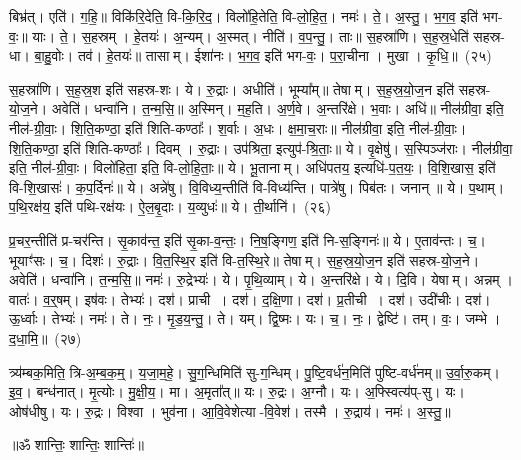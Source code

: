 बिभ्र॑त्। एति॑। ग॒हि॒॥ 
विकि॑रि॒देति॒ वि-कि॒रि॒द॒। विलो॑हि॒तेति॒ वि-लो॒हि॒त॒। नमः॑। ते॒। अ॒स्तु॒। भ॒ग॒व॒ इति॑ भग-वः॒॥ 
याः। ते॒। स॒हस्रम्। हे॒तयः॑। अ॒न्यम्। अ॒स्मत्। नीति॑। व॒प॒न्तु॒। ताः॥ 
स॒हस्रा॑णि। स॒ह॒स्र॒धेति॑ सहस्र-धा। बा॒हु॒वोः। तव॑। हे॒तयः॑॥ 
तासाम्। ईशा॑नः। भ॒ग॒व॒ इति॑ भग-वः॒। प॒रा॒चीना। मुखा। कृ॒धि॒॥~(२५)


स॒हस्रा॑णि। स॒ह॒स्र॒श इति॑ सहस्र-शः। ये। रु॒द्राः। अधीति॑। भूम्या᳚म्॥ 
तेषाम्। स॒ह॒स्र॒यो॒ज॒न इति॑ सहस्र-यो॒ज॒ने। अवेति॑। धन्वा॑नि। त॒न्म॒सि॒॥ 
अ॒स्मिन्। म॒ह॒ति। अ॒र्ण॒वे। अ॒न्तरि॑क्षे। भ॒वाः। अधि॑॥ 
नील॑ग्रीवा॒ इति॒ नील॑-ग्री॒वाः॒। शि॒ति॒कण्ठा॒ इति॑ शिति-कण्ठाः᳚। श॒र्वाः। अ॒धः। क्ष॒मा॒च॒राः॥ 
नील॑ग्रीवा॒ इति॒ नील॑-ग्री॒वाः॒। शि॒ति॒कण्ठा॒ इति॑ शिति-कण्ठाः᳚। दिवम्। रु॒द्राः। उप॑श्रिता॒ इत्युप॑-श्रि॒ताः॒॥ 
ये। वृ॒क्षेषु॑। स॒स्पिञ्ज॑राः। नील॑ग्रीवा॒ इति॒ नील॑-ग्री॒वाः॒। विलो॑हिता॒ इति॒ वि-लो॒हि॒ताः॒॥ 
ये। भू॒तानाम्। अधि॑पतय॒ इत्यधि॑-प॒त॒यः॒। वि॒शि॒खास॒ इति॑ वि-शि॒खासः॑। क॒प॒र्दिनः॑॥ 
ये। अन्ने॑षु। वि॒विध्य॒न्तीति॑ वि-विध्य॑न्ति। पात्रे॑षु। पिब॑तः। जनान्॥ 
ये। प॒थाम्। प॒थि॒रक्ष॑य॒ इति॑ पथि-रक्ष॑यः। ऐ॒ल॒बृ॒दाः। य॒व्युधः॑॥ 
ये। ती॒र्थानि॑।~(२६)


प्र॒चर॒न्तीति॑ प्र-चर॑न्ति। सृ॒काव॑न्त॒ इति॑ सृ॒का-व॒न्तः॒। नि॒ष॒ङ्गिण॒ इति॑ नि-स॒ङ्गिनः॑॥ 
ये। ए॒ताव॑न्तः। च॒। भूयाꣳ॑सः। च॒। दिशः॑। रु॒द्राः। वि॒त॒स्थि॒र इति॑ वि-त॒स्थि॒रे॥ 
तेषाम्। स॒ह॒स्र॒यो॒ज॒न इति॑ सहस्र-यो॒ज॒ने। अवेति॑। धन्वा॑नि। त॒न्म॒सि॒॥ 
नमः॑। रु॒द्रेभ्यः॑। ये। पृ॒थि॒व्याम्। ये। अ॒न्तरि॑क्षे। ये। दि॒वि। येषाम्। अन्नम्। वातः॑। व॒र्॒‌षम्।
 इष॑वः। तेभ्यः॑। दश॑। प्राची। दश॑। द॒क्षि॒णा। दश॑। प्र॒तीची। दश॑। उदी॑चीः। दश॑। ऊ॒र्ध्वाः।
  तेभ्यः॑। नमः॑। ते। नः॒। मृ॒ड॒य॒न्तु॒। ते। यम्। द्वि॒ष्मः। यः। च॒। नः॒। द्वेष्टि॑। तम्। वः॒। जम्भे। द॒धा॒मि॒॥~(२७)

त्र्य॑म्बक॒मिति॒ त्रि-अ॒म्ब॒क॒म्॒। य॒जा॒म॒हे॒। सु॒ग॒न्धिमिति॑ सु-ग॒न्धिम्। पु॒ष्टि॒वर्ध॑न॒मिति॑ पुष्टि-वर्ध॑नम्॥ 
उ॒र्वा॒रु॒कम्। इ॒व॒। बन्ध॑नात्। मृ॒त्योः। मु॒क्षी॒य॒। मा। अ॒मृता᳚त्॥ 
यः। रु॒द्रः। अ॒ग्नौ। यः। अ॒फ्स्वित्य॑प्-सु। यः। ओष॑धीषु। यः। रु॒द्रः। विश्वा। भुव॑ना। आ॒वि॒वेशेत्या-वि॒वेश॑। तस्मै। रु॒द्राय॑। नमः॑। अ॒स्तु॒॥

\centerline{॥ॐ शान्तिः॒ शान्तिः॒ शान्तिः॑॥}



